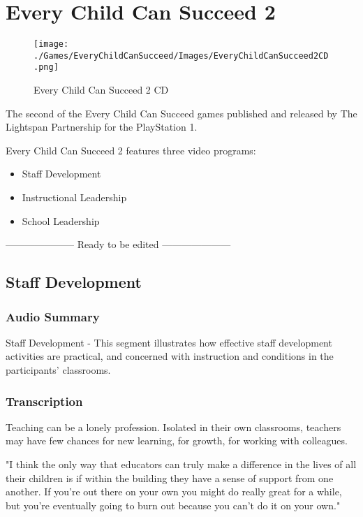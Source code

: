 \chapter{Every Child Can Succeed 2}

\begin{figure}[H]
    \centering
    \texttt{[image: ./Games/EveryChildCanSucceed/Images/EveryChildCanSucceed2CD.png]}
    \caption{Every Child Can Succeed 2 CD}
\end{figure}

The second of the Every Child Can Succeed games published and released by The Lightspan Partnership for the PlayStation 1.

Every Child Can Succeed 2 features three video programs:

\begin{itemize}
    \item Staff Development
    \item Instructional Leadership
    \item School Leadership
\end{itemize}

\clearpage
\newpage

--------------------- Ready to be edited ---------------------

\section{Staff Development}

\subsection{Audio Summary}

Staff Development - This segment illustrates how effective staff development activities are practical, and concerned with instruction and conditions in the participants' classrooms.

\subsection{Transcription}

Teaching can be a lonely profession. Isolated in their own classrooms, teachers may have few chances for new learning, for growth, for working with colleagues.

"I think the only way that educators can truly make a difference in the lives of all their children is if within the building they have a sense of support from one another. If you're out there on your own you might do really great for a while, but you're eventually going to burn out because you can't do it on your own."

